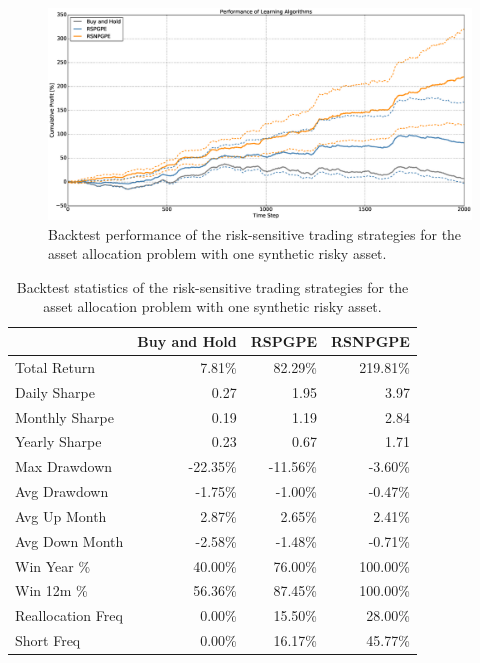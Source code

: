 \begin{figure}[t!]
	\centering
	\includegraphics[width=1.0\textwidth]{Images/8_5_single_synthetic_sensitive_performance}
	\caption[Backtest performance with one synthetic risky asset]{Backtest performance of the risk-sensitive trading strategies for the asset allocation problem with one synthetic risky asset.}
	\label{fig:single_synthetic_sensitive_performance}
\end{figure}

\begin{table}[h!]
\centering
\begin{tabular}{@{}lrrr@{}}
\toprule
                  & Buy and Hold & RSPGPE   & RSNPGPE  \\ \midrule
Total Return      & 7.81\%       & 82.29\%  & 219.81\% \\
Daily Sharpe      & 0.27         & 1.95     & 3.97     \\
Monthly Sharpe    & 0.19         & 1.19     & 2.84     \\
Yearly Sharpe     & 0.23         & 0.67     & 1.71     \\
Max Drawdown      & -22.35\%     & -11.56\% & -3.60\%  \\
Avg Drawdown      & -1.75\%      & -1.00\%  & -0.47\%  \\
Avg Up Month      & 2.87\%       & 2.65\%   & 2.41\%   \\
Avg Down Month    & -2.58\%      & -1.48\%  & -0.71\%  \\
Win Year \%       & 40.00\%      & 76.00\%  & 100.00\% \\
Win 12m \%        & 56.36\%      & 87.45\%  & 100.00\% \\
Reallocation Freq & 0.00\%       & 15.50\%  & 28.00\%  \\
Short Freq        & 0.00\%       & 16.17\%  & 45.77\%  \\ \bottomrule
\end{tabular}
\caption[Backtest statistics for risk-sensitive learning with one synthetic risky asset]{Backtest statistics of the risk-sensitive trading strategies for the asset allocation problem with one synthetic risky asset.}
\label{tab:single_synthetic_sensitive_performance}
\end{table}
\clearpage
